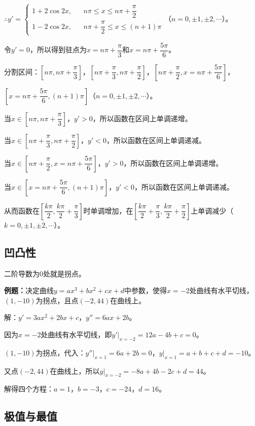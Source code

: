\documentclass[UTF8, 12pt]{ctexart}
\begin{document}
$\therefore y'=\left\{\begin{array}{lcl}
    1+2\cos 2x, & & n\pi\leqslant x\leqslant n\pi+\dfrac{\pi}{2} \\
    1-2\cos 2x, & &n\pi+\dfrac{\pi}{2}\leqslant x\leqslant (n+1)\pi
\end{array}\right.$（$n=0,\pm 1,\pm2,\cdots$）。

令$y'=0$，所以得到驻点为$x=n\pi+\dfrac{\pi}{3}$和$x=n\pi+\dfrac{5\pi}{6}$。

分割区间：$\left[n\pi,n\pi+\dfrac{\pi}{3}\right]$，$\left[n\pi+\dfrac{\pi}{3},n\pi+\dfrac{\pi}{2}\right]$，$\left[n\pi+\dfrac{\pi}{2},x=n\pi+\dfrac{5\pi}{6}\right]$，

$\left[x=n\pi+\dfrac{5\pi}{6},(n+1)\pi\right]$（$n=0,\pm 1,\pm2,\cdots$）。

当$x\in\left[n\pi,n\pi+\dfrac{\pi}{3}\right]$，$y'>0$，所以函数在区间上单调递增。

当$x\in\left[n\pi+\dfrac{\pi}{3},n\pi+\dfrac{\pi}{2}\right]$，$y'<0$，所以函数在区间上单调递减。

当$x\in\left[n\pi+\dfrac{\pi}{2},x=n\pi+\dfrac{5\pi}{6}\right]$，$y'>0$，所以函数在区间上单调递增。

当$x\in\left[x=n\pi+\dfrac{5\pi}{6},(n+1)\pi\right]$，$y'<0$，所以函数在区间上单调递减。

从而函数在$\left[\dfrac{k\pi}{2},\dfrac{k\pi}{2}+\dfrac{\pi}{3}\right]$时单调增加，在$\left[\dfrac{k\pi}{2}+\dfrac{\pi}{3},\dfrac{k\pi}{2}+\dfrac{\pi}{2}\right]$上单调减少（$k=0,\pm 1,\pm2,\cdots$）。

\subsection{凹凸性}

二阶导数为0处就是拐点。

\textbf{例题：}决定曲线$y=ax^3+bx^2+cx+d$中参数，使得$x=-2$处曲线有水平切线，$(1,-10)$为拐点，且点$(-2,44)$在曲线上。

解：$y'=3ax^2+2bx+c$，$y''=6ax+2b$。

因为$x=-2$处曲线有水平切线，即$y'\vert_{x=-2}=12a-4b+c=0$。

$(1,-10)$为拐点，代入：$y''\vert_{x=1}=6a+2b=0$，$y\vert_{x=1}=a+b+c+d=-10$。

又点$(-2,44)$在曲线上，所以$y\vert_{x=-2}=-8a+4b-2c+d=44$。

解得四个方程：$a=1$，$b=-3$，$c=-24$，$d=16$。

\subsection{极值与最值}
\end{document}
